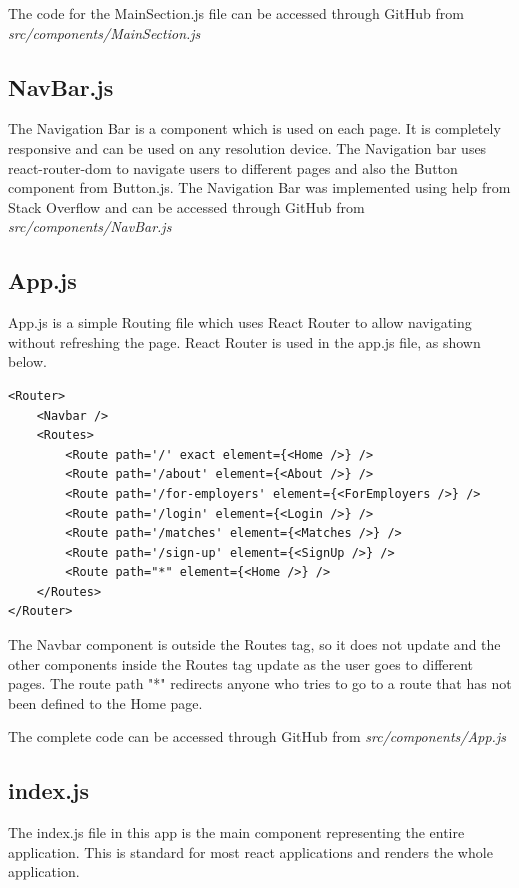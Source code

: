 The code for the MainSection.js file can be accessed through GitHub from \newline \textit{src/components/MainSection.js}

\subsection{NavBar.js}
The Navigation Bar is a component which is used on each page. It is completely responsive and can be used on any resolution device. The Navigation bar uses react-router-dom to navigate users to different pages and also the Button component from Button.js. The Navigation Bar was implemented using help from Stack Overflow \parencite{Reference33} and can be accessed through GitHub from \newline \textit{src/components/NavBar.js}

\subsection{App.js}
App.js is a simple Routing file which uses React Router to allow navigating without refreshing the page. React Router is used in the app.js file, as shown below.

\begin{lstlisting}
<Router>
    <Navbar />
    <Routes>
        <Route path='/' exact element={<Home />} />
        <Route path='/about' element={<About />} />
        <Route path='/for-employers' element={<ForEmployers />} />
        <Route path='/login' element={<Login />} />
        <Route path='/matches' element={<Matches />} />
        <Route path='/sign-up' element={<SignUp />} />
        <Route path="*" element={<Home />} />
    </Routes>
</Router>
\end{lstlisting}

The Navbar component is outside the Routes tag, so it does not update and the other components inside the Routes tag update as the user goes to different pages. The route path "*" redirects anyone who tries to go to a route that has not been defined to the Home page.

The complete code can be accessed through GitHub from \newline \textit{src/components/App.js}

\subsection{index.js}
The index.js file in this app is the main component representing the entire application. This is standard for most react applications and renders the whole application. 

